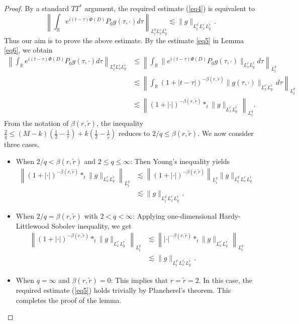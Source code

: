 \documentclass[a4paper,11pt, reqno]{amsart}
\theoremstyle{definition}
\theoremstyle{remark}
\numberwithin{equation}{section}
\begin{document}
	\begin{proof}
		By   a standard $T T^*$ argument,  the required estimate (\ref{eq4}) is equivalent to
		$$
		\left\|\int_{\mathbb{R}} e^{i(t-\tau)\Phi(D)} P_0 g(\tau,\cdot) d \tau\right\|_{L_t^q L_x^r L_y^{\tilde{r}}} \lesssim\|g\|_{L_t^{q^{\prime}} L_x^{r^{\prime}} L_y^{\tilde{r}^{\prime}}}.
		$$
		Thus our aim is to prove the above estimate. By  the estimate \eqref{eq5} in Lemma \ref{eq6}, we obtain
		$$
		\begin{aligned}
			\left\|\int_{\mathbb{R}} e^{i(t-\tau)\Phi(D)} P_0 g(\tau,\cdot) d \tau\right\|_{L_t^q L_x^r L_y^{\tilde{r}}} & \leq\left\|\int_{\mathbb{R}} \| e^{i(t-\tau)\Phi(D)} P_0 g(\tau,\cdot) \|_{L_x^r L_y^{\tilde{r}}} d \tau\right\|_{L_t^q} \\
			& \lesssim\left\|\int_{\mathbb{R}}  (1+|t-\tau|)^{-\beta(r, \widetilde{r})}\|g(\tau,\cdot)\|_{L_x^{r^{\prime}} L_y^{\tilde{r}^{\prime}}} d \tau\right\|_{L_t^q} \\
			& \lesssim\left\|(1+|\cdot|)^{-\beta(r, \widetilde{r})} *_t \| g \|_{L_x^{r^{\prime}} L_y^{\tilde{r}^{\prime}}}\right\|_{L_t^q}.
		\end{aligned}
		$$
		From the notation of $\beta(r, \tilde{r})$,  the inequality $	\frac{2}{q} \leq(M-k)\left(\frac{1}{2}-\frac{1}{r}\right)+k\left(\frac{1}{2}-\frac{1}{\widetilde{r}}\right)$  reduces to   $2 / q \leq \beta(r, \tilde{r})$. We now consider three cases.
		\begin{itemize}
			\item When $2 / q<\beta(r, \tilde{r})$ and $2 \leq q \leq \infty$:    Then Young's inequality yields
			$$
			\begin{aligned}
				\left\|(1+|\cdot|)^{-\beta(r, \widetilde{r})} *_t \| g \|_{L_x^{r^{\prime}} L_y^{\widetilde{r}}}\right\|_{L_t^q} & \lesssim\left\|(1+|\cdot|)^{-\beta(r, \widetilde{r})}\right\|_{L_t^q}\|g\|_{L_t^{q^{\prime}} L_x^{r^{\prime}} L_y^{\widetilde{r}}} \\
				& \lesssim\|g\|_{L_t^{q^{\prime}} L_x^{r^{\prime}} L_y^{\widetilde{r}^{\prime}}}.
			\end{aligned}
			$$
			\item 	When $2 / q=\beta(r, \tilde{r})$ with $2<q<\infty$: Applying one-dimensional Hardy-Littlewood Sobolev inequality, we get 
			$$
			\begin{aligned}
				\left\|(1+|\cdot|)^{- \beta(r, \tilde{r})} *_t \| g \|_{L_x^{r^{\prime}} L_y^{\tilde{r}^{\prime}}}\right\|_{L_t^q} & \lesssim\left\||\cdot|^{- \beta(r, \tilde{r})} *_t \| g \|_{L_x^{r^{\prime}} L_y^{\tilde{r}^{\prime}}}\right\|_{L_t^q} \\
				& \lesssim\|g\|_{L_t^{q^{\prime}} L_x^{\tau_x^{\prime}} L_y^{\tilde{r}^{\prime}}}.
			\end{aligned}
			$$
			\item 	When  $q=\infty$ and $ \beta(r, \widetilde{r})=0$: This implies  that  $r=\widetilde{r}=2$. In this case, the required estimate (\ref{eq5})   holds trivially by Plancherel's theorem. This completes the proof of the lemma.
		\end{itemize} \end{proof} 
\end{document}
